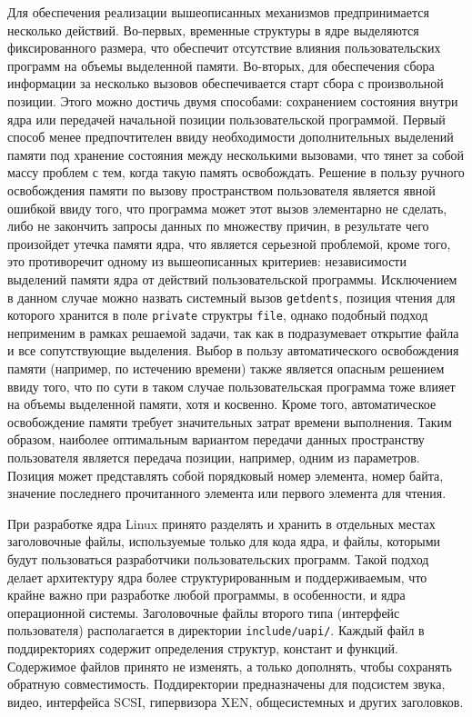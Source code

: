 Для обеспечения реализации вышеописанных механизмов предпринимается несколько
действий. Во-первых, временные структуры в ядре выделяются фиксированного
размера, что обеспечит отсутствие влияния пользовательских программ на объемы
выделенной памяти. Во-вторых, для обеспечения сбора информации за несколько
вызовов обеспечивается старт сбора с произвольной позиции. Этого можно достичь
двумя способами: сохранением состояния внутри ядра или передачей начальной
позиции пользовательской программой. Первый способ менее предпочтителен ввиду
необходимости дополнительных выделений памяти под хранение состояния между
несколькими вызовами, что тянет за собой массу проблем с тем, когда такую память
освобождать. Решение в пользу ручного освобождения памяти по вызову
пространством пользователя является явной ошибкой ввиду того, что программа
может этот вызов элементарно не сделать, либо не закончить запросы данных по
множеству причин, в результате чего произойдет утечка памяти ядра, что является
серьезной проблемой, кроме того, это противоречит одному из вышеописанных
критериев: независимости выделений памяти ядра от действий пользовательской
программы. Исключением в данном случае можно назвать системный вызов
\texttt{getdents}, позиция чтения для которого хранится в поле \texttt{private}
структры \texttt{file}, однако подобный подход неприменим в рамках решаемой
задачи, так как в подразумевает открытие файла и все сопутствующие выделения.
Выбор в пользу автоматического освобождения памяти (например, по
истечению времени) также является опасным решением ввиду того, что по сути в
таком случае пользовательская программа тоже влияет на объемы выделенной памяти,
хотя и косвенно. Кроме того, автоматическое освобождение памяти требует
значительных затрат времени выполнения. Таким образом, наиболее оптимальным
вариантом передачи данных пространству пользователя является передача позиции,
например, одним из параметров. Позиция может представлять собой порядковый номер
элемента, номер байта, значение последнего прочитанного элемента или первого
элемента для чтения.

При разработке ядра Linux принято разделять и хранить в отдельных местах
заголовочные файлы, используемые только для кода ядра, и файлы, которыми будут
пользоваться разработчики пользовательских программ. Такой подход делает
архитектуру ядра более структурированным и поддерживаемым, что крайне важно при
разработке любой программы, в особенности, и ядра операционной системы.
Заголовочные файлы второго типа (интерфейс пользователя) располагается в
директории \texttt{include/uapi/}. Каждый файл в поддиректориях содержит
определения структур, констант и функций. Содержимое файлов принято не изменять,
а только дополнять, чтобы сохранять обратную совместимость. Поддиректории
предназначены для подсистем звука, видео, интерфейса SCSI, гипервизора XEN,
общесистемных и других заголовков.

